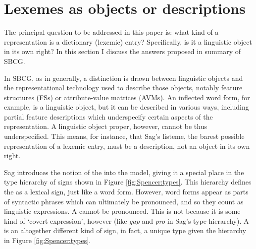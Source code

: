 \documentclass[output=paper]{langsci/langscibook}
\begin{document}



\section{Lexemes as objects or descriptions} \label{sec:Spencer:objordesc}


The principal question to be addressed in this paper is: what kind of a representation is a dictionary (lexemic) entry? Specifically, is it a linguistic object in its own right? In this section I discuss the answers proposed in %
%
 summary of SBCG.

In SBCG, as in  generally, a distinction is drawn between linguistic objects and the representational technology used to describe those objects, notably feature structures (FSs) or attribute-value matrices (AVMs). An inflected word form, for example, is a linguistic object, but it can be described in various ways, including partial feature descriptions which underspecify certain aspects of the representation. A linguistic object proper, however, cannot be thus underspecified. This means, for instance, that Sag's  listeme, the barest possible representation of a lexemic entry, must be a description, not an object in its own right.

Sag  introduces the notion of the  into the model, giving it a special place in the type hierarchy of signs shown in Figure \ref{fig:Spencer:types}. This hierarchy defines the  as a lexical sign, just like a word form. However, word forms appear as parts of syntactic phrases which can ultimately be pronounced, and so they count as linguistic expressions. A  cannot be pronounced. This is not because it is some kind of `covert expression', however (like \textit{gap} and \textit{pro} in Sag's type hierarchy). A  is an altogether different kind of sign, in fact, a unique type given the hierarchy in Figure \ref{fig:Spencer:types}.
\end{document}
